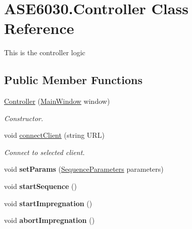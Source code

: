 \hypertarget{class_a_s_e6030_1_1_controller}{}\section{A\+S\+E6030.\+Controller Class Reference}
\label{class_a_s_e6030_1_1_controller}


This is the controller logic  


\subsection*{Public Member Functions}
\begin{DoxyCompactItemize}
\item 
\hyperlink{class_a_s_e6030_1_1_controller_aa7df468c34d983c6efe88f12abeffb79}{Controller} (\hyperlink{class_a_s_e6030_1_1_main_window}{Main\+Window} window)
\begin{DoxyCompactList}\small\item\em Constructor. \end{DoxyCompactList}\item 
void \hyperlink{class_a_s_e6030_1_1_controller_a5f84e69b4885c561df4bc177fcc54d40}{connect\+Client} (string U\+RL)
\begin{DoxyCompactList}\small\item\em Connect to selected client. \end{DoxyCompactList}\item 
\mbox{\label{class_a_s_e6030_1_1_controller_afee09ba01da47aa772ce3da642e08e47}} 
void {\bfseries set\+Params} (\hyperlink{class_a_s_e6030_1_1_sequence_parameters}{Sequence\+Parameters} parameters)
\item 
\mbox{\label{class_a_s_e6030_1_1_controller_afca76c3628ed37f21c1aac044a5e0441}} 
void {\bfseries start\+Sequence} ()
\item 
\mbox{\label{class_a_s_e6030_1_1_controller_aaad2a679e6a2f5db4193f58fd7482def}} 
void {\bfseries start\+Impregnation} ()
\item 
\mbox{\label{class_a_s_e6030_1_1_controller_ab508adee38f1120e4213efd9104480cf}} 
void {\bfseries abort\+Impregnation} ()
\end{DoxyCompactItemize}
